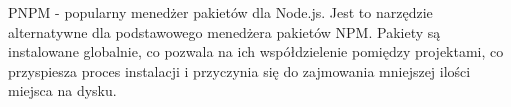 PNPM - popularny menedżer pakietów dla Node.js. Jest to narzędzie alternatywne dla podstawowego menedżera pakietów NPM. Pakiety są instalowane globalnie, co pozwala na ich współdzielenie pomiędzy projektami, co przyspiesza proces instalacji i przyczynia się do zajmowania mniejszej ilości miejsca na dysku. \autocite{pnpm}